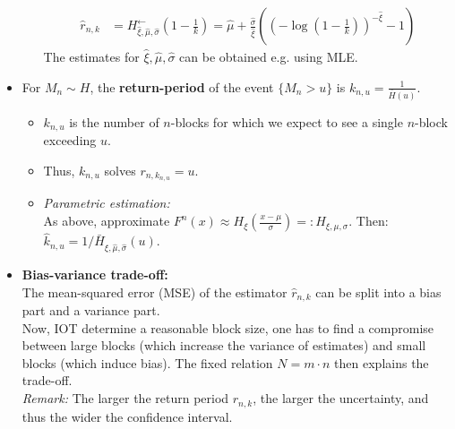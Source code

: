 \documentclass[a4paper,landscape,8pt,fleqn]{scrartcl}
\renewcommand{\emph}[1]{\textbf{#1}}
\begin{document}
\begin{multicols*}{3}
\begin{itemize}
\begin{itemize}
\begin{align*}
\hat r_{n,k} &= H^\leftarrow_{\hat \xi, \hat \mu, \hat \sigma} \left(1-\frac{1}{k} \right) = \hat \mu + \frac{\hat \sigma}{\hat \xi} \left( \left( -\log\left( 1 - \frac{1}{k} \right) \right)^{- \hat \xi} - 1 \right)
\end{align*}
The estimates for $\hat \xi, \hat \mu, \hat \sigma$ can be obtained e.g. using MLE.
\end{itemize}
\item For $M_n \sim H$, the \emph{return-period} of the event $\lbrace M_n > u \rbrace$ is $k_{n,u} = \frac{1}{\bar H(u)}$.
\begin{itemize}
\item $k_{n,u}$ is the number of $n$-blocks for which we expect to see a single $n$-block exceeding $u$.
\item Thus, $k_{n,u}$ solves $r_{n,k_{n,u}} = u$.
\item \textit{Parametric estimation:} \\
As above, approximate $F^n(x) \approx H_\xi \left( \frac{x-\mu}{\sigma} \right) =: H_{\xi, \mu, \sigma}$. Then: $\hat k_{n,u} = 1/\bar H_{\hat \xi, \hat \mu, \hat \sigma}(u)$.
\end{itemize}
\item \emph{Bias-variance trade-off:} \\
The mean-squared error (MSE) of the estimator $\hat r_{n,k}$ can be split into a bias part and a variance part. \\
Now, IOT determine a reasonable block size, one has to find a compromise between large blocks (which increase the variance of estimates) and small blocks (which induce bias). The fixed relation $N = m \cdot n$ then explains the trade-off. \\
\textit{Remark:} The larger the return period $r_{n,k}$, the larger the uncertainty, and thus the wider the confidence interval.
\end{itemize}


\end{multicols*}
\end{document}
